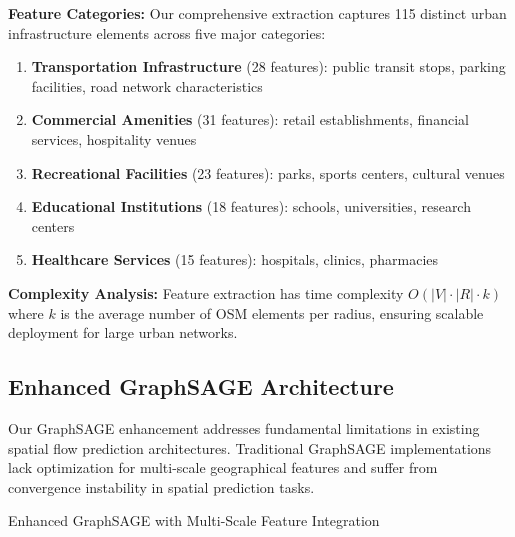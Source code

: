 \documentclass[twocolumn,11pt]{IEEEtran}  %
\begin{document}
\textbf{Feature Categories:} Our comprehensive extraction captures 115 distinct urban infrastructure elements across five major categories:
\begin{enumerate}
\item \textbf{Transportation Infrastructure} (28 features): public transit stops, parking facilities, road network characteristics
\item \textbf{Commercial Amenities} (31 features): retail establishments, financial services, hospitality venues
\item \textbf{Recreational Facilities} (23 features): parks, sports centers, cultural venues
\item \textbf{Educational Institutions} (18 features): schools, universities, research centers
\item \textbf{Healthcare Services} (15 features): hospitals, clinics, pharmacies
\end{enumerate}

\textbf{Complexity Analysis:} Feature extraction has time complexity $O(|V| \cdot |R| \cdot k)$ where $k$ is the average number of OSM elements per radius, ensuring scalable deployment for large urban networks.

\subsection{Enhanced GraphSAGE Architecture}

Our GraphSAGE enhancement addresses fundamental limitations in existing spatial flow prediction architectures. Traditional GraphSAGE implementations lack optimization for multi-scale geographical features and suffer from convergence instability in spatial prediction tasks.

\begin{algorithm}
\caption{Enhanced GraphSAGE with Multi-Scale Feature Integration}
\label{alg:enhanced_graphsage}
\begin{algorithmic}[1]
    \ENDFOR
\ENDFOR
{}
\end{algorithmic}
\end{algorithm}
\end{document}
